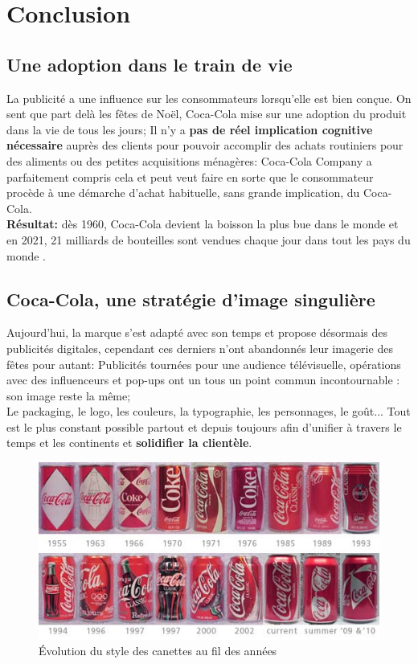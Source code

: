 \chapter{Conclusion}

\label{Conclusion}

\section{Une adoption dans le train de vie}

La publicité a une influence sur les consommateurs lorsqu’elle est bien conçue. 
On sent que part delà les fêtes de Noël, Coca-Cola mise sur une adoption du produit dans la vie de tous les jours;
Il n'y a \textbf{pas de réel implication cognitive nécessaire} auprès des clients pour pouvoir accomplir des achats routiniers pour des aliments ou des petites acquisitions ménagères: Coca-Cola Company a parfaitement compris cela et peut veut faire en sorte que le consommateur procède à une démarche d'achat habituelle, sans grande implication, du Coca-Cola.\\
\textbf{Résultat:} dès 1960, Coca-Cola devient la boisson la plus bue dans le monde et en 2021, 21 milliards de bouteilles sont vendues chaque jour dans tout les pays du monde \parencite{Ref5}.


\section{Coca-Cola, une stratégie d'image singulière}

Aujourd’hui, la marque s'est adapté avec son temps et propose désormais des publicités digitales, cependant ces derniers n'ont abandonnés leur imagerie des fêtes pour autant: Publicités tournées pour une audience télévisuelle, opérations avec des influenceurs et pop-ups ont un tous un point commun incontournable : son image reste la même;\\
Le packaging, le logo, les couleurs, la typographie, les personnages, le goût... Tout est le plus constant possible partout et depuis toujours afin d'unifier à travers le temps et les continents et \textbf{solidifier la clientèle}.

\hfill \break

\begin{figure}[th]
\centering
\includegraphics[width=120mm]{medias/evolution_coca}
\decoRule
\caption{Évolution du style des canettes au fil des années}
\end{figure}


